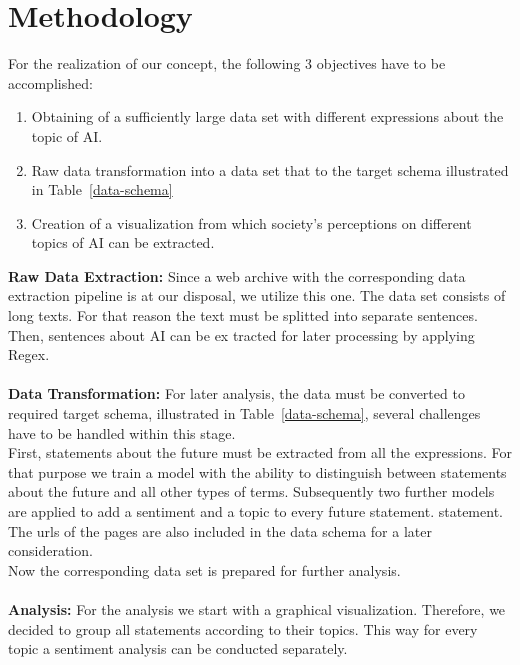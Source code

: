 \section{Methodology}

For the realization of our concept, the following 3 objectives have to be accomplished:

\begin{enumerate}
    \item Obtaining of a sufficiently large data set with different expressions about the topic of AI.
    \item Raw data transformation into a data set that to the target schema illustrated in Table~\ref{data-schema}
    \item Creation of a visualization from which society's perceptions on different topics of AI can be extracted.
\end{enumerate}%
%
%
\textbf{Raw Data Extraction:}
Since a web archive with the corresponding data extraction pipeline is at our disposal, we utilize this one.
The data set consists of long texts.
For that reason the text must be splitted into separate sentences.
Then, sentences about AI can be ex tracted for later processing by applying Regex.
\\
\\
%
\textbf{Data Transformation:}
For later analysis, the data must be converted to required target schema, illustrated in Table~\ref{data-schema}, several challenges have to be handled within this stage.
\\
First, statements about the future must be extracted from all the expressions.
For that purpose we train a model with the ability to distinguish between statements about the future and all other types of terms.
Subsequently two further models are applied to add a sentiment and a topic to every future statement. statement.
The urls of the pages are also included in the data schema for a later consideration.
\\
Now the corresponding data set is prepared for further analysis.
\\
\\
\textbf{Analysis:}
For the analysis we start with a graphical visualization.
Therefore, we decided to group all statements according to their topics.
This way for every topic a sentiment analysis can be conducted separately.


